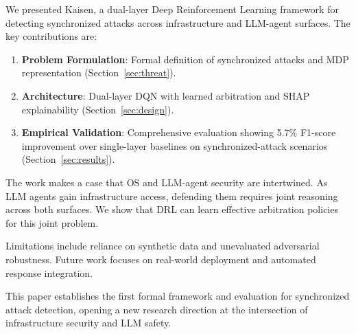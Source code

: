 \documentclass[conference]{IEEEtran}
\begin{document}
We presented Kaisen, a dual-layer Deep Reinforcement Learning framework for detecting synchronized attacks across infrastructure and LLM-agent surfaces. The key contributions are:

\begin{enumerate}
\item \textbf{Problem Formulation}: Formal definition of synchronized attacks and MDP representation (Section~\ref{sec:threat}).
\item \textbf{Architecture}: Dual-layer DQN with learned arbitration and SHAP explainability (Section~\ref{sec:design}).
\item \textbf{Empirical Validation}: Comprehensive evaluation showing 5.7\% F1-score improvement over single-layer baselines on synchronized-attack scenarios (Section~\ref{sec:results}).
\end{enumerate}

The work makes a case that OS and LLM-agent security are intertwined. As LLM agents gain infrastructure access, defending them requires joint reasoning across both surfaces. We show that DRL can learn effective arbitration policies for this joint problem.

Limitations include reliance on synthetic data and unevaluated adversarial robustness. Future work focuses on real-world deployment and automated response integration.

This paper establishes the first formal framework and evaluation for synchronized attack detection, opening a new research direction at the intersection of infrastructure security and LLM safety.
\end{document}
